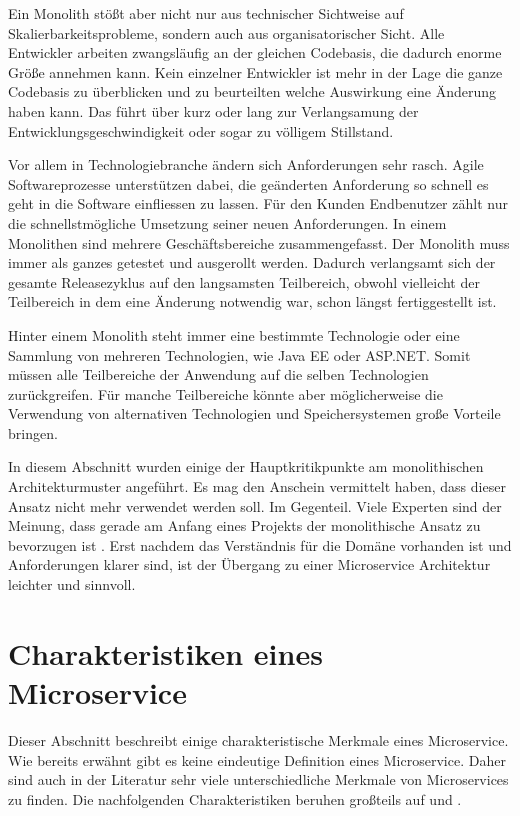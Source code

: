 Ein Monolith stößt aber nicht nur aus technischer Sichtweise auf Skalierbarkeitsprobleme, sondern auch aus organisatorischer Sicht. Alle Entwickler arbeiten zwangsläufig an der gleichen Codebasis, die dadurch enorme Größe annehmen kann. Kein einzelner Entwickler ist mehr in der Lage die ganze Codebasis zu überblicken und zu beurteilten welche Auswirkung eine Änderung haben kann. Das führt über kurz oder lang zur Verlangsamung der Entwicklungsgeschwindigkeit oder sogar zu völligem Stillstand.

Vor allem in Technologiebranche ändern sich Anforderungen sehr rasch. Agile Softwareprozesse unterstützen dabei, die geänderten Anforderung so schnell es geht in die Software einfliessen zu lassen. Für den Kunden \bzw Endbenutzer zählt nur die schnellstmögliche Umsetzung seiner neuen Anforderungen. In einem Monolithen sind mehrere Geschäftsbereiche zusammengefasst. Der Monolith muss immer als ganzes getestet und ausgerollt werden. Dadurch verlangsamt sich der gesamte Releasezyklus auf den langsamsten Teilbereich, obwohl vielleicht der Teilbereich in dem eine Änderung notwendig war, schon längst fertiggestellt ist.

Hinter einem Monolith steht immer eine bestimmte Technologie oder eine Sammlung von mehreren Technologien, wie \zB Java EE oder ASP.NET. Somit müssen alle Teilbereiche der Anwendung auf die selben Technologien zurückgreifen. Für manche Teilbereiche könnte aber möglicherweise die Verwendung von alternativen Technologien und Speichersystemen große Vorteile bringen.

In diesem Abschnitt wurden einige der Hauptkritikpunkte am monolithischen Architekturmuster angeführt. Es mag den Anschein vermittelt haben, dass dieser Ansatz nicht mehr verwendet werden soll. Im Gegenteil. Viele Experten sind der Meinung, dass gerade am Anfang eines Projekts der monolithische Ansatz zu bevorzugen ist \cite{FowlerMolithFist}. Erst nachdem das Verständnis für die Domäne vorhanden ist und Anforderungen klarer sind, ist der Übergang zu einer Microservice Architektur leichter und sinnvoll. 

\section{Charakteristiken eines Microservice}

Dieser Abschnitt beschreibt einige charakteristische Merkmale eines Microservice. Wie bereits erwähnt gibt es keine eindeutige Definition eines Microservice. Daher sind auch in der Literatur sehr viele unterschiedliche Merkmale von Microservices zu finden. Die nachfolgenden Charakteristiken beruhen großteils auf \cite{HorsdalMS} und \cite{FowlerMS}.

